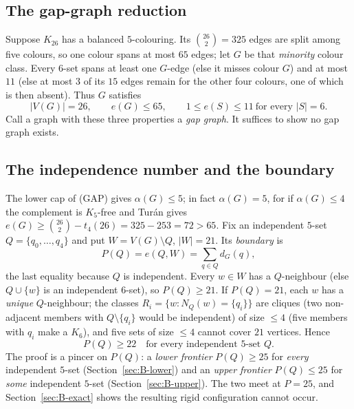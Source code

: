\documentclass[11pt,reqno]{amsart}
\theoremstyle{definition}
\theoremstyle{remark}
\newcommand{\abs}[1]{\left|#1\right|}
\begin{document}
\subsection{The gap-graph reduction}
Suppose $K_{26}$ has a balanced $5$-colouring. Its $\binom{26}{2}=325$ edges are split
among five colours, so one colour spans at most $65$ edges; let $G$ be that
\emph{minority} colour class. Every $6$-set spans at least one $G$-edge (else it misses
colour $G$) and at most $11$ (else at most $3$ of its $15$ edges remain for the other
four colours, one of which is then absent). Thus $G$ satisfies
\begin{equation}
  \abs{V(G)}=26,\qquad e(G)\le 65,\qquad 1\le e(S)\le 11\ \text{for every }\abs S=6.
  \tag{GAP}
\end{equation}
Call a graph with these three properties a \emph{gap graph}. It suffices to show no gap
graph exists.

\subsection{The independence number and the boundary}\label{ssec:B-boundary}
The lower cap of (GAP) gives $\alpha(G)\le 5$; in fact $\alpha(G)=5$, for if
$\alpha(G)\le 4$ the complement is $K_5$-free and Tur\'an gives
$e(G)\ge\binom{26}{2}-t_4(26)=325-253=72>65$. Fix an independent $5$-set
$Q=\{q_0,\dots,q_4\}$ and put $W=V(G)\setminus Q$, $\abs W=21$. Its \emph{boundary} is
\[
  P(Q)=e(Q,W)=\sum_{q\in Q} d_G(q),
\]
the last equality because $Q$ is independent. Every $w\in W$ has a $Q$-neighbour (else
$Q\cup\{w\}$ is an independent $6$-set), so $P(Q)\ge 21$. If $P(Q)=21$, each $w$ has a
\emph{unique} $Q$-neighbour; the classes $R_i=\{w:N_Q(w)=\{q_i\}\}$ are cliques (two
non-adjacent members with $Q\setminus\{q_i\}$ would be independent) of size $\le 4$ (five
members with $q_i$ make a $K_6$), and five sets of size $\le 4$ cannot cover $21$
vertices. Hence
\begin{equation}
  P(Q)\ge 22\quad\text{for every independent $5$-set }Q. \tag{$\ast$}
\end{equation}
The proof is a pincer on $P(Q)$: a \emph{lower frontier} $P(Q)\ge 25$ for \emph{every}
independent $5$-set (Section~\ref{sec:B-lower}) and an \emph{upper frontier}
$P(Q)\le 25$ for \emph{some} independent $5$-set (Section~\ref{sec:B-upper}). The two meet
at $P=25$, and Section~\ref{sec:B-exact} shows the resulting rigid configuration cannot
occur.

\end{document}
